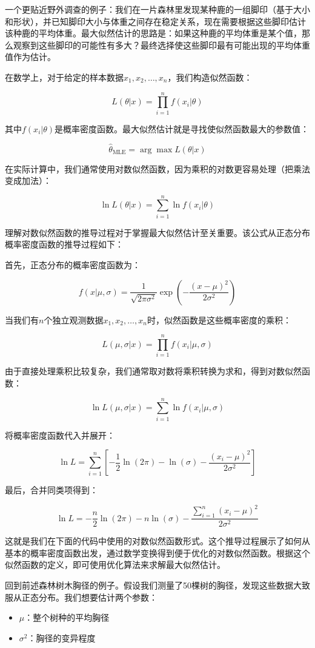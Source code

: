 \documentclass[
  twoside,12pt,fontset=none]{ctexbook}
\providecommand{\tightlist}{%
  \setlength{\itemsep}{0pt}\setlength{\parskip}{0pt}}
\begin{document}
一个更贴近野外调查的例子：我们在一片森林里发现某种鹿的一组脚印（基于大小和形状），并已知脚印大小与体重之间存在稳定关系，现在需要根据这些脚印估计该种鹿的平均体重。最大似然估计的思路是：如果这种鹿的平均体重是某个值，那么观察到这些脚印的可能性有多大？最终选择使这些脚印最有可能出现的平均体重值作为估计。

在数学上，对于给定的样本数据\(x_1, x_2, \ldots, x_n\)，我们构造似然函数：

\[L(\theta|x) = \prod_{i=1}^{n} f(x_i|\theta)\]

其中\(f(x_i|\theta)\)是概率密度函数。最大似然估计就是寻找使似然函数最大的参数值：

\[\hat{\theta}_{\text{MLE}} = \arg\max L(\theta|x)\]

在实际计算中，我们通常使用对数似然函数，因为乘积的对数更容易处理（把乘法变成加法）：

\[\ln L(\theta|x) = \sum_{i=1}^{n} \ln f(x_i|\theta)\]

理解对数似然函数的推导过程对于掌握最大似然估计至关重要。该公式从正态分布概率密度函数的推导过程如下：

首先，正态分布的概率密度函数为：

\[f(x|\mu,\sigma) = \frac{1}{\sqrt{2\pi\sigma^2}} \exp\left(-\frac{(x-\mu)^2}{2\sigma^2}\right)\]

当我们有\(n\)个独立观测数据\(x_1, x_2, \ldots, x_n\)时，似然函数是这些概率密度的乘积：

\[L(\mu,\sigma|x) = \prod_{i=1}^{n} f(x_i|\mu,\sigma)\]

由于直接处理乘积比较复杂，我们通常取对数将乘积转换为求和，得到对数似然函数：

\[\ln L(\mu,\sigma|x) = \sum_{i=1}^{n} \ln f(x_i|\mu,\sigma)\]

将概率密度函数代入并展开：

\[\ln L = \sum_{i=1}^{n} \left[-\frac{1}{2} \ln(2\pi) - \ln(\sigma) - \frac{(x_i-\mu)^2}{2\sigma^2}\right]\]

最后，合并同类项得到：

\[\ln L = -\frac{n}{2} \ln(2\pi) - n \ln(\sigma) - \frac{\sum_{i=1}^{n} (x_i-\mu)^2}{2\sigma^2}\]

这就是我们在下面的代码中使用的对数似然函数形式。这个推导过程展示了如何从基本的概率密度函数出发，通过数学变换得到便于优化的对数似然函数。根据这个似然函数的定义，即可使用优化算法来求解最大似然估计。

回到前述森林树木胸径的例子。假设我们测量了50棵树的胸径，发现这些数据大致服从正态分布。我们想要估计两个参数：

\begin{itemize}
\tightlist
\item
  \(\mu\)：整个树种的平均胸径
\item
  \(\sigma^2\)：胸径的变异程度
\end{itemize}
\end{document}
